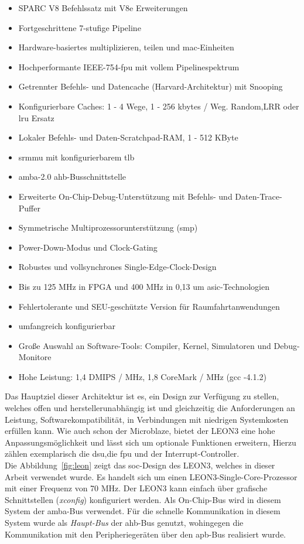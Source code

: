 \begin{itemize}
  \item SPARC V8 Befehlssatz mit V8e Erweiterungen
\item Fortgeschrittene 7-stufige Pipeline
\item Hardware-basiertes multiplizieren, teilen und \ac{mac}-Einheiten
\item Hochperformante IEEE-754-\ac{fpu} mit vollem Pipelinespektrum
\item Getrennter Befehls- und Datencache (Harvard-Architektur) mit Snooping
\item Konfigurierbare Caches: 1 - 4 Wege, 1 - 256 kbytes / Weg. Random,LRR oder \ac{lru} Ersatz
\item Lokaler Befehls- und Daten-Scratchpad-RAM, 1 - 512 KByte
\item \ac{srmmu} mit konfigurierbarem \ac{tlb}
\item \ac{amba}-2.0 \ac{ahb}-Busschnittstelle
\item Erweiterte On-Chip-Debug-Unterstützung mit Befehls- und Daten-Trace-Puffer
\item Symmetrische Multiprozessorunterstützung (\ac{smp})
\item Power-Down-Modus und Clock-Gating
\item Robustes und vollsynchrones Single-Edge-Clock-Design
\item Bis zu 125 MHz in FPGA und 400 MHz in 0,13 um \ac{asic}-Technologien
\item Fehlertolerante und SEU-geschützte Version für Raumfahrtanwendungen
\item umfangreich konfigurierbar
\item Große Auswahl an Software-Tools: Compiler, Kernel, Simulatoren und Debug-Monitore
\item Hohe Leistung: 1,4 DMIPS / MHz, 1,8 CoreMark / MHz (gcc -4.1.2)
\end{itemize}

Das Hauptziel dieser Architektur ist es, ein Design zur Verfügung zu stellen, welches offen und herstellerunabhängig ist und gleichzeitig die Anforderungen an Leistung, Softwarekompatibilität,
in Verbindungen mit niedrigen Systemkosten erfüllen kann. Wie auch schon der Microblaze, bietet der LEON3 eine hohe Anpassungsmöglichkeit und lässt sich um optionale Funktionen erweitern,
Hierzu zählen exemplarisch die \ac{dsu},die  \ac{fpu} und der Interrupt-Controller.\\
Die Abbildung~\ref{fig:leon} zeigt das \ac{soc}-Design des LEON3, welches in dieser Arbeit verwendet wurde. Es handelt sich um einen LEON3-Single-Core-Prozessor mit einer Frequenz von
70 MHz. Der LEON3 kann einfach über grafische Schnittstellen (\emph{xconfig}) konfiguriert werden. Als On-Chip-Bus wird in diesem System der \ac{amba}-Bus verwendet.
Für die schnelle Kommunikation in diesem System wurde als \emph{Haupt-Bus} der \ac{ahb}-Bus genutzt, wohingegen die Kommunikation mit den Peripheriegeräten über den \ac{apb}-Bus realisiert wurde.\\



